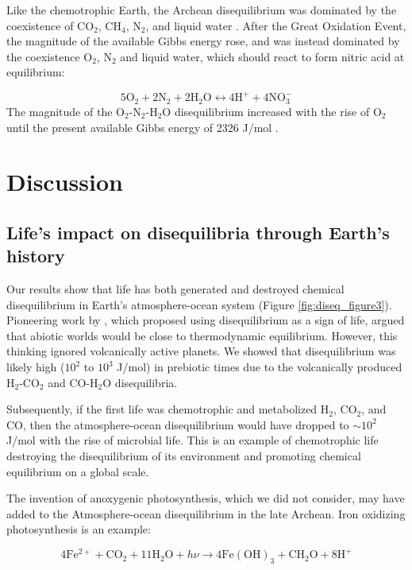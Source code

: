 Like the chemotrophic Earth, the Archean disequilibrium was dominated by the coexistence of CO$_2$, CH$_4$, N$_2$, and liquid water \citep{KrissansenTotton_2018c}. After the Great Oxidation Event, the magnitude of the available Gibbs energy rose, and was instead dominated by the coexistence O$_2$, N$_2$ and liquid water, which should react to form nitric acid at equilibrium:

\begin{equation}
  \label{eq:o2n2h2o_diseq_react}
  5 \mathrm{O_2} + 2 \mathrm{N_2} + 2 \mathrm{H_2O} \leftrightarrow 4 \mathrm{H^{+}} + 4 \mathrm{NO_3^{-}}
\end{equation}
The magnitude of the O$_2$-N$_2$-H$_2$O disequilibrium increased with the rise of O$_2$ until the present available Gibbs energy of 2326 J/mol \citep{KrissansenTotton_2016}. 

\section{Discussion}

\subsection{Life's impact on disequilibria through Earth's history}

Our results show that life has both generated and destroyed chemical disequilibrium in Earth's atmosphere-ocean system (Figure \ref{fig:diseq_figure3}). Pioneering work by \citet{Lovelock_1975}, which proposed using disequilibrium as a sign of life, argued that abiotic worlds would be close to thermodynamic equilibrium. However, this thinking ignored volcanically active planets. We showed that disequilibrium was likely high ($10^2$ to $10^3$ J/mol) in prebiotic times due to the volcanically produced H$_2$-CO$_2$ and CO-H$_2$O disequilibria.

Subsequently, if the first life was chemotrophic and metabolized H$_2$, CO$_2$, and CO, then the atmosphere-ocean disequilibrium would have dropped to $\sim 10^2$ J/mol with the rise of microbial life. This is an example of chemotrophic life destroying the disequilibrium of its environment and promoting chemical equilibrium on a global scale.

The invention of anoxygenic photosynthesis, which we did not consider, may have added to the Atmosphere-ocean disequilibrium in the late Archean. Iron oxidizing photosynthesis is an example: 

\begin{equation}
  4 \mathrm{Fe^{2+}} + \mathrm{CO_2} + 11 \mathrm{H_2O} + h\nu \rightarrow 4 \mathrm{Fe(OH)_3} + \mathrm{CH_2O} + 8 \mathrm{H^{+}}
\end{equation}

